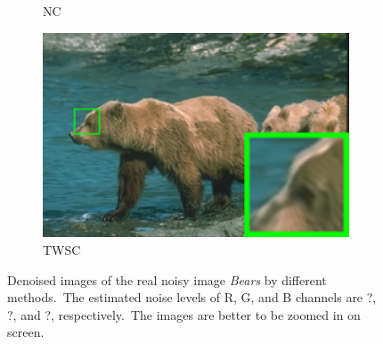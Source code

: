 \begin{figure}
\begin{subfigure}[t]{0.24\textwidth}
		\caption{NC}
    \end{subfigure}
    \hfill
    \begin{subfigure}[t]{0.24\textwidth}
        \centering
        \includegraphics[width=1\textwidth]{images/twsc/nc/resize_br_TWSC_bears.png}
		\caption{TWSC}
    \end{subfigure}
    \caption{Denoised images of the real noisy image \textsl{Bears} \cite{ncwebsite} by different methods.\ The estimated noise levels of R, G, and B channels are ?, ?, and ?, respectively.\ The images are better to be zoomed in on screen.}
    \label{fig3}
\end{figure}


